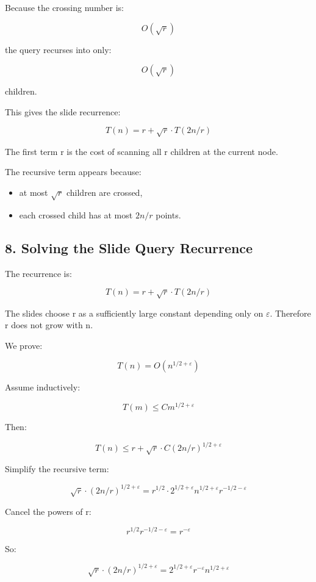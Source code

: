 \documentclass[
  11pt,
]{article}
\providecommand{\tightlist}{%
  \setlength{\itemsep}{0pt}\setlength{\parskip}{0pt}}
\begin{document}
Because the crossing number is:

\[
O(\sqrt r)
\]

the query recurses into only:

\[
O(\sqrt r)
\]

children.

This gives the slide recurrence:

\[
T(n)=r+\sqrt r\cdot T(2n/r)
\]

The first term r is the cost of scanning all r children at the current
node.

The recursive term appears because:

\begin{itemize}
\tightlist
\item
  at most \(\sqrt r\) children are crossed,
\item
  each crossed child has at most \(2n/r\) points.
\end{itemize}

\hypertarget{solving-the-slide-query-recurrence}{%
\subsection{8. Solving the Slide Query
Recurrence}\label{solving-the-slide-query-recurrence}}

The recurrence is:

\[
T(n)=r+\sqrt r\cdot T(2n/r)
\]

The slides choose r as a sufficiently large constant depending only on
\(\varepsilon\). Therefore r does not grow with n.

We prove:

\[
T(n)=O(n^{1/2+\varepsilon})
\]

Assume inductively:

\[
T(m)\le C m^{1/2+\varepsilon}
\]

Then:

\[
T(n)\le r+\sqrt r\cdot C(2n/r)^{1/2+\varepsilon}
\]

Simplify the recursive term:

\[
\sqrt r\cdot (2n/r)^{1/2+\varepsilon} = r^{1/2}\cdot 2^{1/2+\varepsilon}n^{1/2+\varepsilon}r^{-1/2-\varepsilon}
\]

Cancel the powers of r:

\[
r^{1/2}r^{-1/2-\varepsilon}=r^{-\varepsilon}
\]

So:

\[
\sqrt r\cdot (2n/r)^{1/2+\varepsilon} = 2^{1/2+\varepsilon}r^{-\varepsilon}n^{1/2+\varepsilon}
\]
\end{document}
